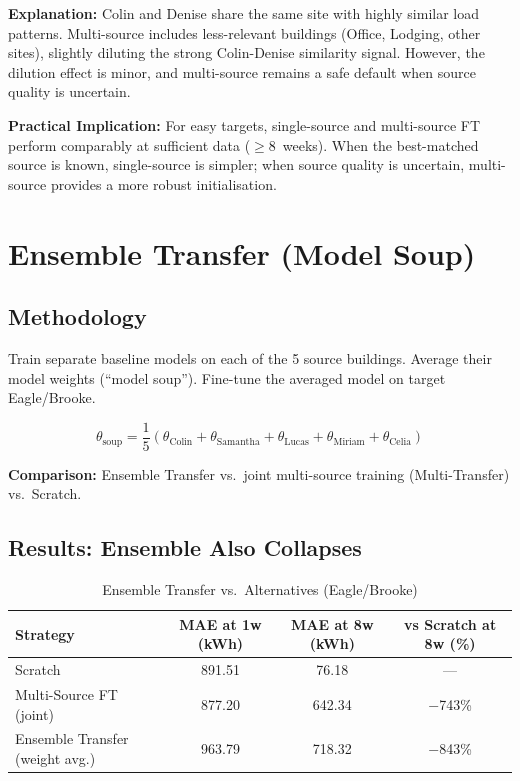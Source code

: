 \documentclass[12pt,a4paper]{report}
\begin{document}
\textbf{Explanation:} Colin and Denise share the same site with highly similar load patterns. Multi-source includes less-relevant buildings (Office, Lodging, other sites), slightly diluting the strong Colin-Denise similarity signal. However, the dilution effect is minor, and multi-source remains a safe default when source quality is uncertain.

\textbf{Practical Implication:} For easy targets, single-source and multi-source FT perform comparably at sufficient data ($\geq$8~weeks). When the best-matched source is known, single-source is simpler; when source quality is uncertain, multi-source provides a more robust initialisation.

\section{Ensemble Transfer (Model Soup)}

\subsection{Methodology}

Train separate baseline models on each of the 5 source buildings. Average their model weights (``model soup''). Fine-tune the averaged model on target Eagle/Brooke.

\[
\theta_{\text{soup}} = \frac{1}{5} (\theta_{\text{Colin}} + \theta_{\text{Samantha}} + \theta_{\text{Lucas}} + \theta_{\text{Miriam}} + \theta_{\text{Celia}})
\]

\textbf{Comparison:} Ensemble Transfer vs.\ joint multi-source training (Multi-Transfer) vs.\ Scratch.

\subsection{Results: Ensemble Also Collapses}

\begin{table}[H]
\centering
\caption{Ensemble Transfer vs.\ Alternatives (Eagle/Brooke)}
\small
\begin{tabular}{lccc}
\toprule
\textbf{Strategy} & \textbf{MAE at 1w (kWh)} & \textbf{MAE at 8w (kWh)} & \textbf{vs Scratch at 8w (\%)} \\
\midrule
Scratch & 891.51 & 76.18 & --- \\
Multi-Source FT (joint) & 877.20 & 642.34 & $-$743\% \\
Ensemble Transfer (weight avg.) & 963.79 & 718.32 & $-$843\% \\
\bottomrule
\end{tabular}
\end{table}
\end{document}
